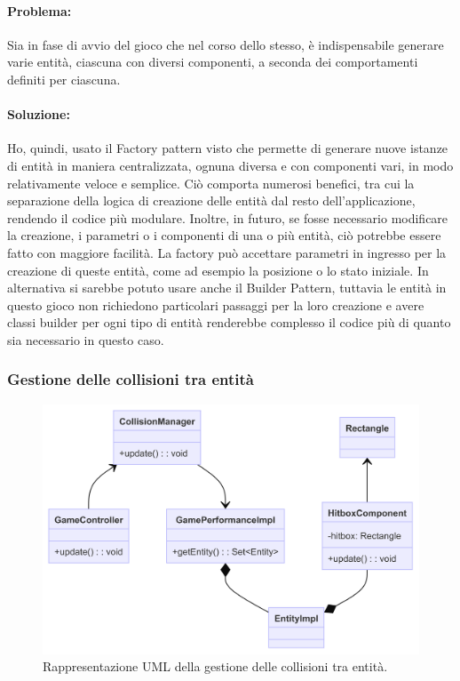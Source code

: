 \documentclass[a4paper,12pt]{report}
\begin{document}
\paragraph{Problema:}
Sia in fase di avvio del gioco che nel corso dello stesso, è indispensabile generare varie entità, ciascuna con diversi componenti, a seconda dei comportamenti definiti per ciascuna.

\paragraph{Soluzione:}
Ho, quindi, usato il Factory pattern visto che permette di generare nuove istanze di entità in maniera centralizzata, ognuna diversa e con componenti vari, in modo relativamente veloce e semplice. Ciò comporta numerosi benefici, tra cui la separazione della logica di creazione delle entità dal resto dell'applicazione, rendendo il codice più modulare. Inoltre, in futuro, se fosse necessario modificare la creazione, i parametri o i componenti di una o più entità, ciò potrebbe essere fatto con maggiore facilità. La factory può accettare parametri in ingresso per la creazione di queste entità, come ad esempio la posizione o lo stato iniziale. In alternativa si sarebbe potuto usare anche il Builder Pattern, tuttavia le entità in questo gioco non richiedono particolari passaggi per la loro creazione e avere classi builder per ogni tipo di entità renderebbe complesso il codice più di quanto sia necessario in questo caso.

\subsubsection{Gestione delle collisioni tra entità}

\begin{figure}[H]
\centering{}
\includegraphics[width=\textwidth]{img/collisions.png}
\caption{Rappresentazione UML della gestione delle collisioni tra entità.}
\end{figure}
\end{document}
